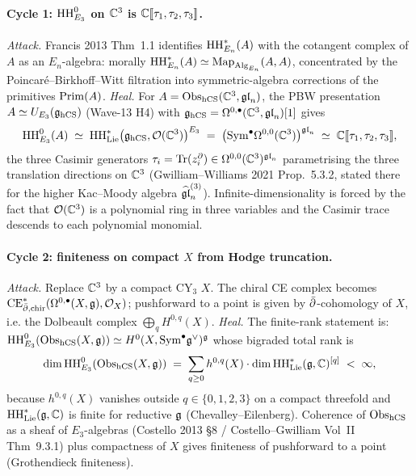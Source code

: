 \paragraph{Cycle 1: $\mathrm{HH}^0_{E_3}$ on $\mathbb{C}^3$ is $\mathbb{C}[\![\tau_1, \tau_2, \tau_3]\!]$.}
\emph{Attack.} Francis 2013 Thm~1.1 identifies $\mathrm{HH}^*_{E_n}(A)$ with
the cotangent complex of $A$ as an $E_n$-algebra: morally
$\mathrm{HH}^*_{E_n}(A) \simeq \mathrm{Map}_{\mathrm{Alg}_{E_n}}(A, A)$, concentrated
by the Poincar\'e--Birkhoff--Witt filtration into symmetric-algebra
corrections of the primitives $\mathrm{Prim}(A)$.
\emph{Heal.} For $A = \mathrm{Obs}_{\mathrm{hCS}}(\mathbb{C}^3, \mathfrak{gl}_n)$, the PBW presentation
$A \simeq U_{E_3}(\mathfrak{g}_{\mathrm{hCS}})$ (Wave-13 H4) with
$\mathfrak{g}_{\mathrm{hCS}} = \Omega^{0,\bullet}(\mathbb{C}^3, \mathfrak{gl}_n)[1]$ gives
\[
  \mathrm{HH}^0_{E_3}(A) \;\simeq\; \mathrm{HH}^*_{\mathrm{Lie}}\bigl(\mathfrak{g}_{\mathrm{hCS}}, \mathcal{O}(\mathbb{C}^3)\bigr)^{E_3}
  \;=\; \bigl(\mathrm{Sym}^\bullet \Omega^{0,0}(\mathbb{C}^3)\bigr)^{\mathfrak{gl}_n}
  \;\simeq\; \mathbb{C}[\![\tau_1, \tau_2, \tau_3]\!],
\]
the three Casimir generators $\tau_i = \mathrm{Tr}(z_i^{\partial}) \in
\Omega^{0,0}(\mathbb{C}^3)^{\mathfrak{gl}_n}$ parametrising the three translation
directions on $\mathbb{C}^3$ (Gwilliam--Williams 2021 Prop.~5.3.2, stated
there for the higher Kac--Moody algebra $\widehat{\mathfrak{gl}}_n^{(3)}$).
Infinite-dimensionality is forced by the fact that $\mathcal{O}(\mathbb{C}^3)$ is a
polynomial ring in three variables and the Casimir trace descends
to each polynomial monomial.

\paragraph{Cycle 2: finiteness on compact $X$ from Hodge truncation.}
\emph{Attack.} Replace $\mathbb{C}^3$ by a compact CY$_3$ $X$. The chiral
CE complex becomes $\mathrm{CE}^*_{\bar\partial,\mathrm{chir}}(\Omega^{0,\bullet}(X, \mathfrak{g}), \mathcal{O}_X)$;
pushforward to a point is given by $\bar\partial$-cohomology of $X$,
i.e. the Dolbeault complex $\bigoplus_q H^{0,q}(X)$.
\emph{Heal.} The finite-rank statement is: $\mathrm{HH}^0_{E_3}(\mathrm{Obs}_{\mathrm{hCS}}(X, \mathfrak{g}))
\simeq H^0(X, \mathrm{Sym}^\bullet \mathfrak{g}^\vee)^{\mathfrak{g}}$ whose bigraded total rank is
\[
  \dim \mathrm{HH}^0_{E_3}(\mathrm{Obs}_{\mathrm{hCS}}(X, \mathfrak{g})) \;=\;
  \sum_{q \geq 0} h^{0,q}(X) \cdot \dim \mathrm{HH}^*_{\mathrm{Lie}}(\mathfrak{g}, \mathbb{C})^{[q]} \;<\; \infty,
\]
because $h^{0,q}(X)$ vanishes outside $q \in \{0, 1, 2, 3\}$ on a
compact threefold and $\mathrm{HH}^*_{\mathrm{Lie}}(\mathfrak{g}, \mathbb{C})$ is finite for
reductive $\mathfrak{g}$ (Chevalley--Eilenberg). Coherence of $\mathrm{Obs}_{\mathrm{hCS}}$ as
a sheaf of $E_3$-algebras (Costello 2013 \S8 / Costello--Gwilliam
Vol~II Thm~9.3.1) plus compactness of $X$ gives finiteness of
pushforward to a point (Grothendieck finiteness).

